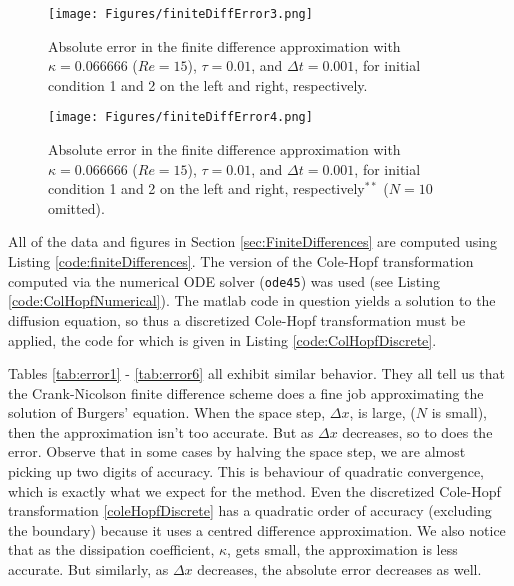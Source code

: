 \documentclass[undefended]{sfuthesis}
\begin{document}
\begin{figure}[!h]
	\centering
	\texttt{[image: Figures/finiteDiffError3.png]}
	\caption{Absolute error in the finite difference approximation with $\kappa = 0.066666$ ($Re = 15$), $\tau = 0.01$, and $\Delta t = 0.001$, for initial condition 1 and 2 on the left and right, respectively.}
	\label{fig:finiteDiffError3}
\end{figure}

\begin{figure}[!h]
	\centering
	\texttt{[image: Figures/finiteDiffError4.png]}
	\caption{Absolute error in the finite difference approximation with $\kappa = 0.066666$ ($Re = 15$), $\tau = 0.01$, and $\Delta t = 0.001$, for initial condition 1 and 2 on the left and right, respectively$^{**}$ ($N = 10$ omitted).}
	\label{fig:finiteDiffError4}
\end{figure}
\clearpage

All of the data and figures in Section \ref{sec:FiniteDifferences} are computed using Listing \ref{code:finiteDifferences}. The version of the Cole-Hopf transformation computed via the numerical ODE solver (\texttt{ode45}) was used (see Listing \ref{code:ColHopfNumerical}). The matlab code in question yields a solution to the diffusion equation, so thus a discretized Cole-Hopf transformation must be applied, the code for which is given in Listing \ref{code:ColHopfDiscrete}.

Tables \ref{tab:error1} - \ref{tab:error6} all exhibit similar behavior. They all tell us that the Crank-Nicolson finite difference scheme does a fine job approximating the solution of Burgers' equation. When the space step, $\Delta x$, is large, ($N$ is small), then the approximation isn't too accurate. But as $\Delta x$ decreases, so to does the error. Observe that in some cases by halving the space step, we are almost picking up two digits of accuracy. This is behaviour of quadratic convergence, which is exactly what we expect for the method. Even the discretized Cole-Hopf transformation \eqref{coleHopfDiscrete} has a quadratic order of accuracy (excluding the boundary) because it uses a centred difference approximation. We also notice that as the dissipation coefficient, $\kappa$, gets small, the approximation is less accurate. But similarly, as $\Delta x$ decreases, the absolute error decreases as well.
\end{document}
